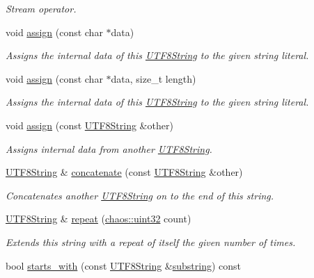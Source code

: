 \begin{DoxyCompactItemize}
\begin{DoxyCompactList}\small\item\em Stream operator. \end{DoxyCompactList}\item 
void \hyperlink{classchaos_1_1str_1_1_u_t_f8_string_a483e71ec1090e346c63bf2b13b37ad7a}{assign} (const char $\ast$data)
\begin{DoxyCompactList}\small\item\em Assigns the internal data of this \hyperlink{classchaos_1_1str_1_1_u_t_f8_string}{U\-T\-F8\-String} to the given string literal. \end{DoxyCompactList}\item 
void \hyperlink{classchaos_1_1str_1_1_u_t_f8_string_a631f935a5b85214a2fa662a78f5693aa}{assign} (const char $\ast$data, size\-\_\-t length)
\begin{DoxyCompactList}\small\item\em Assigns the internal data of this \hyperlink{classchaos_1_1str_1_1_u_t_f8_string}{U\-T\-F8\-String} to the given string literal. \end{DoxyCompactList}\item 
void \hyperlink{classchaos_1_1str_1_1_u_t_f8_string_aff351b1a6276e5e59717bc6c3b67818c}{assign} (const \hyperlink{classchaos_1_1str_1_1_u_t_f8_string}{U\-T\-F8\-String} \&other)
\begin{DoxyCompactList}\small\item\em Assigns internal data from another \hyperlink{classchaos_1_1str_1_1_u_t_f8_string}{U\-T\-F8\-String}. \end{DoxyCompactList}\item 
\hyperlink{classchaos_1_1str_1_1_u_t_f8_string}{U\-T\-F8\-String} \& \hyperlink{classchaos_1_1str_1_1_u_t_f8_string_a8b61a2f73dacd4749d993dad00788d0d}{concatenate} (const \hyperlink{classchaos_1_1str_1_1_u_t_f8_string}{U\-T\-F8\-String} \&other)
\begin{DoxyCompactList}\small\item\em Concatenates another \hyperlink{classchaos_1_1str_1_1_u_t_f8_string}{U\-T\-F8\-String} on to the end of this string. \end{DoxyCompactList}\item 
\hyperlink{classchaos_1_1str_1_1_u_t_f8_string}{U\-T\-F8\-String} \& \hyperlink{classchaos_1_1str_1_1_u_t_f8_string_a5a497616981f69154c1c4924a486c41d}{repeat} (\hyperlink{namespacechaos_a3b3a47ba1e284655bf1a30c441121c60}{chaos\-::uint32} count)
\begin{DoxyCompactList}\small\item\em Extends this string with a repeat of itself the given number of times. \end{DoxyCompactList}\item 
\hypertarget{classchaos_1_1str_1_1_u_t_f8_string_a065a34c88630d3aca883d691322474c0}{bool \hyperlink{classchaos_1_1str_1_1_u_t_f8_string_a065a34c88630d3aca883d691322474c0}{starts\-\_\-with} (const \hyperlink{classchaos_1_1str_1_1_u_t_f8_string}{U\-T\-F8\-String} \&\hyperlink{classchaos_1_1str_1_1_u_t_f8_string_a2d50ab58715264ae175f521816bf670c}{substring}) const }\label{classchaos_1_1str_1_1_u_t_f8_string_a065a34c88630d3aca883d691322474c0}


\end{DoxyCompactItemize}
